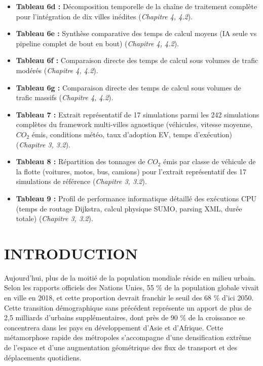 \documentclass[10pt, a4paper]{article}
\begin{document}
\begin{itemize}
{  4.2}).
\item
  \textbf{Tableau 6d :} Décomposition temporelle de la chaîne de
  traitement complète pour l'intégration de dix villes inédites
  (\emph{Chapitre 4, 4.2}).
\item
  \textbf{Tableau 6e :} Synthèse comparative des temps de calcul moyens
  (IA seule vs pipeline complet de bout en bout) (\emph{Chapitre 4,
  4.2}).
\item
  \textbf{Tableau 6f :} Comparaison directe des temps de calcul sous
  volumes de trafic modérés (\emph{Chapitre 4, 4.2}).
\item
  \textbf{Tableau 6g :} Comparaison directe des temps de calcul sous
  volumes de trafic massifs (\emph{Chapitre 4, 4.2}).
\item
  \textbf{Tableau 7 :} Extrait représentatif de 17 simulations parmi les
  242 simulations complètes du framework multi-villes agnostique
  (véhicules, vitesse moyenne, \(CO_2\) émis, conditions météo, taux
  d'adoption EV, temps d'exécution) (\emph{Chapitre 3, 3.2}).
\item
  \textbf{Tableau 8 :} Répartition des tonnages de \(CO_2\) émis par
  classe de véhicule de la flotte (voitures, motos, bus, camions) pour
  l'extrait représentatif des 17 simulations de référence
  (\emph{Chapitre 3, 3.2}).
\item
  \textbf{Tableau 9 :} Profil de performance informatique détaillé des
  exécutions CPU (temps de routage Dijkstra, calcul physique SUMO,
  parsing XML, durée totale) (\emph{Chapitre 3, 3.2}).
\end{itemize}

\newpage

\section{INTRODUCTION}\label{introduction}

Aujourd'hui, plus de la moitié de la population mondiale réside en
milieu urbain. Selon les rapports officiels des Nations Unies, 55 \% de
la population globale vivait en ville en 2018, et cette proportion
devrait franchir le seuil des 68 \% d'ici 2050. Cette transition
démographique sans précédent représente un apport de plus de 2,5
milliards d'urbains supplémentaires, dont près de 90 \% de la croissance
se concentrera dans les pays en développement d'Asie et d'Afrique. Cette
métamorphose rapide des métropoles s'accompagne d'une densification
extrême de l'espace et d'une augmentation géométrique des flux de
transport et des déplacements quotidiens.
\end{document}
